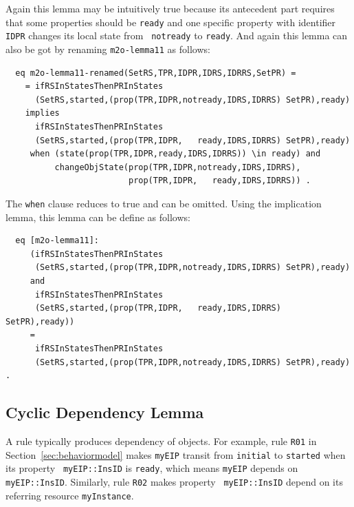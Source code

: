 \documentclass[12pt]{report}
\begin{document}
Again this lemma may be intuitively true because its antecedent part
requires that some properties should be {\tt ready} and one specific
property with identifier {\tt IDPR} changes its local state from {\tt
  notready} to {\tt ready}. And again this lemma can also be got by
renaming {\tt m2o-lemma11} as follows:
\begin{verbatim}
  eq m2o-lemma11-renamed(SetRS,TPR,IDPR,IDRS,IDRRS,SetPR) =
    = ifRSInStatesThenPRInStates
      (SetRS,started,(prop(TPR,IDPR,notready,IDRS,IDRRS) SetPR),ready)
    implies
      ifRSInStatesThenPRInStates
      (SetRS,started,(prop(TPR,IDPR,   ready,IDRS,IDRRS) SetPR),ready)
     when (state(prop(TPR,IDPR,ready,IDRS,IDRRS)) \in ready) and 
          changeObjState(prop(TPR,IDPR,notready,IDRS,IDRRS),
                         prop(TPR,IDPR,   ready,IDRS,IDRRS)) .
\end{verbatim}
The {\tt when} clause reduces to true and can be omitted. Using the
implication lemma, this lemma can be define as follows:
\begin{verbatim}
  eq [m2o-lemma11]:
     (ifRSInStatesThenPRInStates
      (SetRS,started,(prop(TPR,IDPR,notready,IDRS,IDRRS) SetPR),ready)
     and
      ifRSInStatesThenPRInStates
      (SetRS,started,(prop(TPR,IDPR,   ready,IDRS,IDRRS) SetPR),ready))
     = 
      ifRSInStatesThenPRInStates
      (SetRS,started,(prop(TPR,IDPR,notready,IDRS,IDRRS) SetPR),ready) .
\end{verbatim}

\subsection{Cyclic Dependency Lemma}
\label{sec:cyclelemma}
A rule typically produces dependency of objects.  For example, rule
{\tt R01} in Section~\ref{sec:behaviormodel} makes {\tt myEIP} transit
from {\tt initial} to {\tt started} when its property {\tt
  myEIP::InsID} is {\tt ready}, which means {\tt myEIP} depends on
{\tt myEIP::InsID}.  Similarly, rule {\tt R02} makes property {\tt
  myEIP::InsID} depend on its referring resource {\tt myInstance}.
\end{document}
